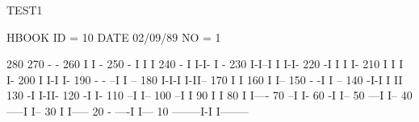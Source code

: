 \begin{Fighere}
\begin{XMPfrac}{3.2}
TEST1
 
HBOOK     ID =        10                                        DATE  02/09/89                          NO =  1
 
     280
     270                                                      - -
     260                                                      I I  -
     250                                                   -  I I  I
     240                                                 - I  I-I- I -
     230                                                 I-I--I  I I-I-
     220                                                -I       I I  I-
     210                                                I        I I   I-
     200                                                I        I-I    I-
     190                                          - - --I                I --
     180                                          I-I-I                  I-II--
     170                                          I                           I
     160                                          I                           I--
     150                                       - -I                             I --
     140                                      -I-I                              I II
     130                                     -I                                 I-II-
     120                                    -I                                      I-
     110                                  --I                                        I--
     100                                --I                                            I
      90                                I                                              I
      80                                I                                              I----
      70                              --I                                                  I-
      60                             -I                                                     I--
      50                          ---I                                                        I--
      40                     -----I                                                             I--
      30                     I                                                                    I-----
      20               - ----I                                                                         I---
      10       --------I-I                                                                                I--------
 

\end{XMPfrac}
\end{Fighere}

